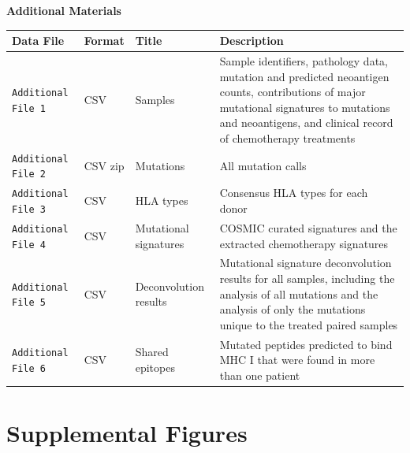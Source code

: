 
\pagebreak
\begin{center}
\textbf{\large Additional Materials}
\end{center}

\setcounter{equation}{0}
\setcounter{figure}{0}
\setcounter{table}{0}
\makeatletter
\renewcommand{\theequation}{S\arabic{equation}}
\renewcommand{\thefigure}{S\arabic{figure}}

\begin{center}
    \begin{tabular}{ | l | l | l | p{8cm} |}
    \hline
    Data File & Format & Title & Description \\ \hline
    \texttt{Additional File 1} & CSV & Samples & Sample identifiers, pathology data, mutation and predicted neoantigen counts, contributions of major mutational signatures to mutations and neoantigens, and clinical record of chemotherapy treatments \\ \hline

    \texttt{Additional File 2} & CSV zip & Mutations & All mutation calls \\ \hline
    
    \texttt{Additional File 3} & CSV & HLA types & Consensus HLA types for each donor \\ \hline
    
    \texttt{Additional File 4} & CSV & Mutational signatures & COSMIC curated signatures and the extracted chemotherapy signatures \\ \hline

    \texttt{Additional File 5} & CSV & Deconvolution results & Mutational signature deconvolution results for all samples, including the analysis of all mutations and the analysis of only the mutations unique to the treated paired samples  \\ \hline
    
    \texttt{Additional File 6} & CSV & Shared epitopes & Mutated peptides predicted to bind MHC I that were found in more than one patient  \\

    \end{tabular}
\end{center}


\section*{Supplemental Figures}


